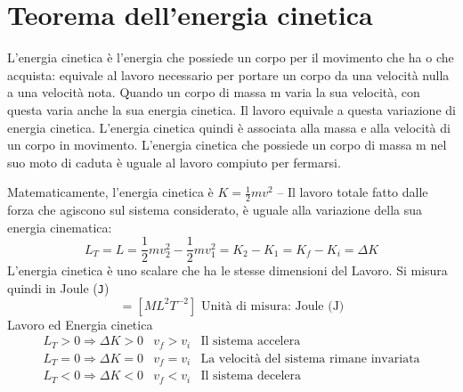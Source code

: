 \section{Teorema dell'energia cinetica}
\begin{defi}
	L'energia cinetica è l'energia che possiede un corpo per il movimento che ha
	o che acquista: equivale al lavoro necessario per portare un corpo da una 
	velocità nulla a una velocità nota. Quando un corpo di massa m varia la sua 
	velocità, con questa varia anche la sua energia cinetica. Il lavoro equivale
	a questa variazione di energia cinetica. L'energia cinetica quindi è
	associata alla massa e alla velocità di un corpo in movimento. L'energia
	cinetica che possiede un corpo di massa m nel suo moto di caduta è uguale al
	lavoro compiuto per fermarsi.
\end{defi}
Matematicamente, l'energia cinetica è $K=\frac{1}{2}mv^2$ -- Il lavoro totale
fatto dalle forza che agiscono sul sistema considerato, è uguale alla
variazione della sua energia cinematica:
\begin{equation*}
	\boxed{L_T=L=\frac{1}{2}mv_2^2-\frac{1}{2}mv_1^2=K_2-K_1=K_f-K_i=\Delta K}
\end{equation*}
L'energia cinetica è uno scalare che ha le stesse dimensioni del Lavoro. Si
misura quindi in Joule ({\tt J})
\begin{equation*}
	[K]=[ML^2T^{-2}] \text{ Unità di misura: Joule (J)}
\end{equation*}
Lavoro ed Energia cinetica
\begin{eqnarray*}
	L_T>0\Rightarrow \Delta K>0 &v_f>v_i & \text{Il sistema accelera}\\
	L_T=0\Rightarrow \Delta K=0 &v_f=v_i & \text{La velocità del sistema rimane
	invariata}\\
	L_T<0\Rightarrow \Delta K<0 &v_f<v_i & \text{Il sistema decelera}
\end{eqnarray*}

